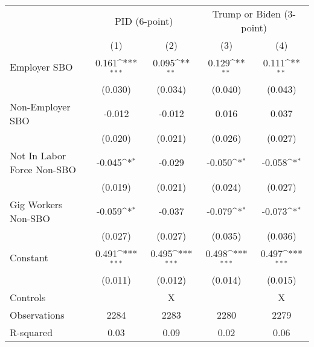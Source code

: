 {
\def\sym#1{\ifmmode^{#1}\else\(^{#1}\)\fi}
\begin{tabular}{l*{4}{c}}
\hline\hline
                    &\multicolumn{2}{c}{PID (6-point)}          &\multicolumn{2}{c}{Trump or Biden (3-point)}\\
                    &\multicolumn{1}{c}{(1)}         &\multicolumn{1}{c}{(2)}         &\multicolumn{1}{c}{(3)}         &\multicolumn{1}{c}{(4)}         \\
\hline
Employer SBO        &       0.161\sym{***}&       0.095\sym{**} &       0.129\sym{**} &       0.111\sym{**} \\
                    &     (0.030)         &     (0.034)         &     (0.040)         &     (0.043)         \\
Non-Employer SBO    &      -0.012         &      -0.012         &       0.016         &       0.037         \\
                    &     (0.020)         &     (0.021)         &     (0.026)         &     (0.027)         \\
Not In Labor Force Non-SBO&      -0.045\sym{*}  &      -0.029         &      -0.050\sym{*}  &      -0.058\sym{*}  \\
                    &     (0.019)         &     (0.021)         &     (0.024)         &     (0.027)         \\
Gig Workers Non-SBO &      -0.059\sym{*}  &      -0.037         &      -0.079\sym{*}  &      -0.073\sym{*}  \\
                    &     (0.027)         &     (0.027)         &     (0.035)         &     (0.036)         \\
Constant            &       0.491\sym{***}&       0.495\sym{***}&       0.498\sym{***}&       0.497\sym{***}\\
                    &     (0.011)         &     (0.012)         &     (0.014)         &     (0.015)         \\
\hline
Controls            &                     &           X         &                     &           X         \\
Observations        &        2284         &        2283         &        2280         &        2279         \\
R-squared           &        0.03         &        0.09         &        0.02         &        0.06         \\
\hline\hline
\end{tabular}
}
